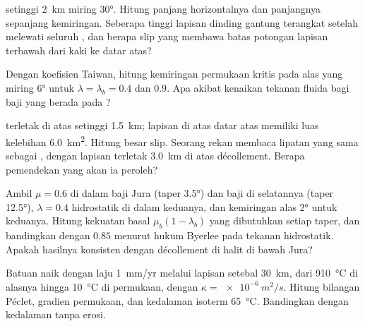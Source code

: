 \begin{exercise}[$\star$]\label{exo:b3:orogenic-wedges:4}
 setinggi \qty{2}{km} miring \ang{30}. Hitung panjang horizontalnya dan
panjangnya sepanjang kemiringan. Seberapa tinggi lapisan dinding gantung terangkat setelah
melewati seluruh , dan berapa slip yang membawa batas potongan lapisan
terbawah dari kaki  ke datar atas?
\end{exercise}

\begin{exercise}[$\star\star$]\label{exo:b3:orogenic-wedges:5}
Dengan koefisien Taiwan, hitung kemiringan permukaan kritis pada alas
yang miring \ang{6} untuk $\lambda = \lambda_b = 0.4$ dan $0.9$. Apa akibat
kenaikan tekanan fluida bagi baji yang berada pada ?
\end{exercise}

\begin{exercise}[$\star\star$]\label{exo:b3:orogenic-wedges:6}
 terletak di atas  setinggi \qty{1.5}{km}; lapisan di atas
datar atas memiliki luas kelebihan \qty{6.0}{km^2}. Hitung besar slip. Seorang rekan
membaca lipatan yang sama sebagai , dengan lapisan terletak \qty{3.0}{km} di atas
décollement. Berapa pemendekan yang akan ia peroleh?
\end{exercise}

\begin{exercise}[$\star\star$]\label{exo:b3:orogenic-wedges:7}
Ambil $\mu = 0.6$ di dalam baji Jura (taper \ang{3.5}) dan baji di
selatannya (taper \ang{12.5}), $\lambda = 0.4$ hidrostatik di dalam keduanya, dan
kemiringan alas \ang{2} untuk keduanya. Hitung kekuatan basal $\mu_b(1 -
\lambda_b)$ yang dibutuhkan setiap taper, dan bandingkan dengan $0.85$ menurut hukum Byerlee
pada tekanan hidrostatik. Apakah hasilnya konsisten dengan décollement di
halit di bawah Jura?
\end{exercise}

\begin{exercise}[$\star\star$]\label{exo:b3:orogenic-wedges:8}
Batuan naik dengan laju \qty{1}{mm/yr} melalui lapisan setebal \qty{30}{km}, dari
\qty{910}{\celsius} di alasnya hingga \qty{10}{\celsius} di permukaan, dengan
$\kappa = \qty{e-6}{m^2/s}$. Hitung bilangan Péclet, gradien permukaan,
dan kedalaman isoterm \qty{65}{\celsius}. Bandingkan dengan kedalaman
tanpa erosi.
\end{exercise}

